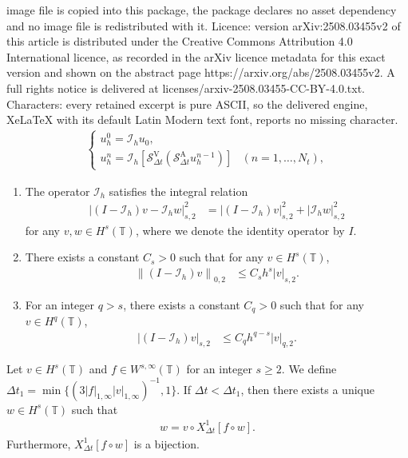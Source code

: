 \documentclass[10pt,a4paper]{amsart}
\def\norm#1#2{\left\|#2\right\|_{#1}}
\def\snorm#1#2{\left|#2\right|_{#1}}
\begin{document}
image file is copied into this package, the package declares no asset dependency and no image file is redistributed with it. Licence: version arXiv:2508.03455v2 of this article is distributed under the Creative Commons Attribution 4.0 International licence, as recorded in the arXiv licence metadata for this exact version and shown on the abstract page https://arxiv.org/abs/2508.03455v2. A full rights notice is delivered at licenses/arxiv-2508.03455-CC-BY-4.0.txt. Characters: every retained excerpt is pure ASCII, so the delivered engine, XeLaTeX with its default Latin Modern text font, reports no missing character.
\begin{align} 
  \label{SL-V} 
  \begin{cases} 
    u_h^0 = \mathcal{I}_h u_0, & \\ 
    u_h^{n} = \mathcal{I}_h \left[\mathcal{S}_{\Delta t}^{\mathrm{V}} (\mathcal{S}_{\Delta t}^{\mathrm{A}} u_h^{n - 1})\right] & (n = 1, \ldots, N_t), 
  \end{cases} 
\end{align} 

\begin{enumerate}[(P1)] 
  \item The operator $ \mathcal{I}_{h} $ satisfies the integral relation \label{p:o} 
  \begin{align} 
    \snorm{s, 2}{(I - \mathcal{I}_{h}) v - \mathcal{I}_{h} w}^2 & = \snorm{s, 2}{(I - \mathcal{I}_{h}) v}^2 + \snorm{s, 2}{\mathcal{I}_{h} w}^2 
  \end{align} 
  for any $ v, w \in H^s (\mathbb{T}) $, where we denote the identity operator by $ I $. 
  \item There exists a constant $ C_s > 0 $ such that for any $ v \in H^s (\mathbb{T}) $, \label{p:s}
  \begin{align}
    \norm{0, 2}{(I - \mathcal{I}_{h}) v} & \leq C_s h^s \snorm{s, 2}{v}. \label{interpolation_error_s}
  \end{align}
  \item For an integer $ q > s $, there exists a constant $ C_q > 0 $ such that for any $ v \in H^q (\mathbb{T}) $, \label{p:q} 
  \begin{align} 
    \snorm{s, 2}{(I - \mathcal{I}_{h}) v} & \leq C_q h^{q - s} \snorm{q, 2}{v}. 
  \end{align} 
\end{enumerate} 

\begin{lemma} \label{lem:s} 
  Let $ v \in H^s (\mathbb{T}) $ and $ f \in W^{s, \infty} (\mathbb{T}) $ for an integer $ s \geq 2 $. We define $ \Delta t_1 = \min\{(3 \snorm{1, \infty}{f} \snorm{1, \infty}{v})^{-1}, 1\} $. If $ \Delta t < \Delta t_1 $, then there exists a unique $ w \in H^s (\mathbb{T}) $ such that 
  \begin{align} 
    w = v \circ {X_{\Delta t}^1}[f \circ w]. \label{a1} 
  \end{align} 
  Furthermore, $ {X_{\Delta t}^1}[f \circ w] $ is a bijection. 
\end{lemma} 
\end{document}

